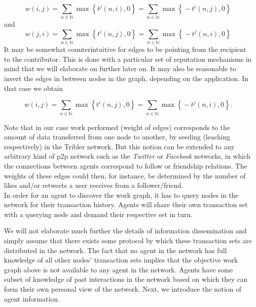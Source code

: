 \documentclass[11pt,a4paper]{report}
\theoremstyle{definition}
\theoremstyle{theorem}
\theoremstyle{proposition}
\theoremstyle{corollary}
\theoremstyle{lemma}
\theoremstyle{example}
\theoremstyle{remark}
\begin{document}
\[
w(i,j) = \sum\limits_{n\in\mathbb{N}}\max\left\lbrace{}t^j(n,i), 0 \right\rbrace = \sum\limits_{n\in\mathbb{N}}\max\left\lbrace{}-t^i(n,j),0\right\rbrace 
\]
\noindent{}and
\[
w(j,i) = \sum\limits_{n\in\mathbb{N}}\max\left\lbrace{}t^i(n,j), 0 \right\rbrace = \sum\limits_{n\in\mathbb{N}}\max\left\lbrace{}-t^j(n,i),0\right\rbrace
\]
\noindent{}It may be somewhat counterintuitive for edges to be pointing from the recipient to the contributor. This is done with a particular set of reputation mechanisms in mind that we will elaborate on further later on. It may also be reasonable to invert the edges in between nodes in the graph, depending on the application. In that case we obtain

\[
w(i,j) = \sum\limits_{n\in\mathbb{N}}\max\left\lbrace{}t^i(n,j), 0 \right\rbrace = \sum\limits_{n\in\mathbb{N}}\max\left\lbrace{}-t^j(n,i),0\right\rbrace.
\]

\noindent{}Note that in our case work performed (weight of edges) corresponds to the amount of data transferred from one node to another, by seeding (leaching respectively) in the Tribler network. But this notion can be extended to any arbitrary kind of p2p network such as the {\it Twitter} or {\it Facebook} networks, in which the connections between agents correspond to follow or friendship relations. The weights of these edges could then, for instance, be determined by the number of likes and/or retweets a user receives from a follower/friend. \vspace{1em}\\

\noindent{}In order for an agent to discover the work graph, it has to query nodes in the network for their transaction history. Agents will share their own transaction set with a querying node and demand their respective set in turn. 

\noindent{}We will not elaborate much further the details of information dissemination and simply assume that there exists some protocol by which these transaction sets are distributed in the network. The fact that no agent in the network has full knowledge of all other nodes' transaction sets implies that the objective work graph above is not available to any agent in the network. Agents have some subset of knowledge of past interactions in the network based on which they can form their own personal view of the network. Next, we introduce the notion of agent information.
\end{document}
